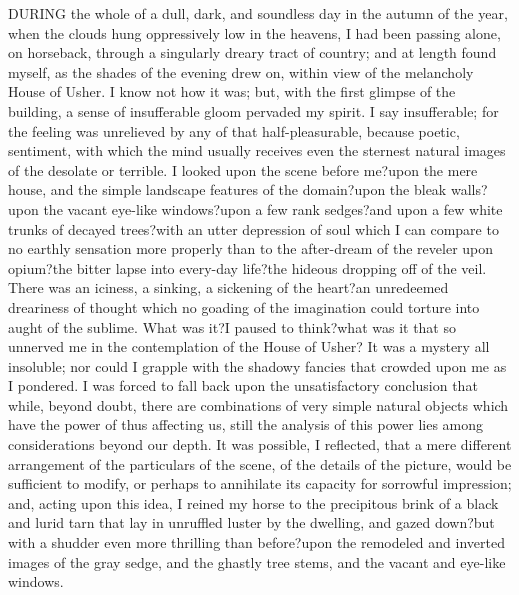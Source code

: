 \documentclass[12pt]{article}
\newcommand{\lowercaseheight}{1ex}
\newcommand{\uppercaseheight}{2ex}
\newcommand{\descenderdepth}{-1ex}
\newenvironment{drillsheet}{%
    \setlength\linenumbersep{0pt}%
    \renewcommand{\thelinenumber}{%
        \begin{tikzpicture}[overlay]
                \draw [ultra thick] ((0,0) -- ++(\textwidth,0);
                \draw ((0,\lowercaseheight) -- ++(\textwidth,0);
                \draw [thick] (0,\uppercaseheight) -- ++(\textwidth,0);
                \draw (0,\descenderdepth) -- ++(\textwidth,0);
        \end{tikzpicture}%
    }%
    \renewcommand\linenumberfont{\normalfont\color{black}}
    \begin{linenumbers}%
        \color{black!25}%
}{
    \end{linenumbers}%
}
\begin{document}
\begin{drillsheet}
    DURING the whole of a dull, dark, and soundless day in the autumn of the year, when the clouds hung oppressively low in the heavens, I had been passing alone, on horseback, through a singularly dreary tract of country; and at length found myself, as the shades of the evening drew on, within view of the melancholy House of Usher. I know not how it was; but, with the first glimpse of the building, a sense of insufferable gloom pervaded my spirit. I say insufferable; for the feeling was unrelieved by any of that half-pleasurable, because poetic, sentiment, with which the mind usually receives even the sternest natural images of the desolate or terrible. I looked upon the scene before me?upon the mere house, and the simple landscape features of the domain?upon the bleak walls?upon the vacant eye-like windows?upon a few rank sedges?and upon a few white trunks of decayed trees?with an utter depression of soul which I can compare to no earthly sensation more properly than to the after-dream of the reveler upon opium?the bitter lapse into every-day life?the hideous dropping off of the veil. There was an iciness, a sinking, a sickening of the heart?an unredeemed dreariness of thought which no goading of the imagination could torture into aught of the sublime. What was it?I paused to think?what was it that so unnerved me in the contemplation of the House of Usher? It was a mystery all insoluble; nor could I grapple with the shadowy fancies that crowded upon me as I pondered. I was forced to fall back upon the unsatisfactory conclusion that while, beyond doubt, there are combinations of very simple natural objects which have the power of thus affecting us, still the analysis of this power lies among considerations beyond our depth. It was possible, I reflected, that a mere different arrangement of the particulars of the scene, of the details of the picture, would be sufficient to modify, or perhaps to annihilate its capacity for sorrowful impression; and, acting upon this idea, I reined my horse to the precipitous brink of a black and lurid tarn that lay in unruffled luster by the dwelling, and gazed down?but with a shudder even more thrilling than before?upon the remodeled and inverted images of the gray sedge, and the ghastly tree stems, and the vacant and eye-like windows.

\end{drillsheet}
\end{document}
